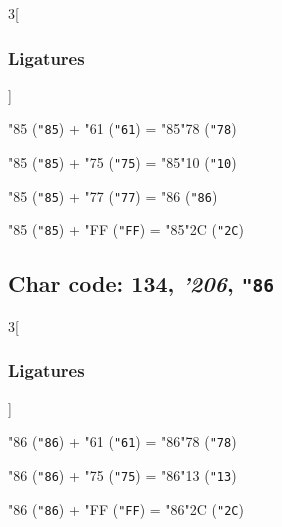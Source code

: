 \documentclass{article}
\newlength{\maxcharwidth}
\begin{document}
\begin{multicols}{3}[\subsubsection{Ligatures}]

{\testfont\char"85\noboundary} ({\tt"85}) + {\testfont\char"61\noboundary} ({\tt"61}) = {\testfont\char"85\noboundary}{\testfont\char"78\noboundary} ({\tt"78}) 

{\testfont\char"85\noboundary} ({\tt"85}) + {\testfont\char"75\noboundary} ({\tt"75}) = {\testfont\char"85\noboundary}{\testfont\char"10\noboundary} ({\tt"10}) 

{\testfont\char"85\noboundary} ({\tt"85}) + {\testfont\char"77\noboundary} ({\tt"77}) = {\testfont\char"86\noboundary} ({\tt"86}) 

{\testfont\char"85\noboundary} ({\tt"85}) + {\testfont\char"FF\noboundary} ({\tt"FF}) = {\testfont\char"85\noboundary}{\testfont\char"2C\noboundary} ({\tt"2C}) 

\end{multicols}

\subsection{Char code: 134, {\it'206}, {\tt"86}}
\label{char_134}


\begin{multicols}{3}[\subsubsection{Ligatures}]

{\testfont\char"86\noboundary} ({\tt"86}) + {\testfont\char"61\noboundary} ({\tt"61}) = {\testfont\char"86\noboundary}{\testfont\char"78\noboundary} ({\tt"78}) 

{\testfont\char"86\noboundary} ({\tt"86}) + {\testfont\char"75\noboundary} ({\tt"75}) = {\testfont\char"86\noboundary}{\testfont\char"13\noboundary} ({\tt"13}) 

{\testfont\char"86\noboundary} ({\tt"86}) + {\testfont\char"FF\noboundary} ({\tt"FF}) = {\testfont\char"86\noboundary}{\testfont\char"2C\noboundary} ({\tt"2C}) 

\end{multicols}
\end{document}
